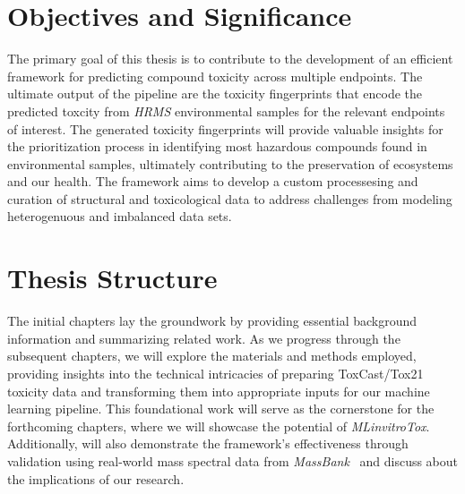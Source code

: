  

\section{Objectives and Significance}

The primary goal of this thesis is to contribute to the development of an efficient framework for predicting compound toxicity across multiple endpoints. The ultimate output of the pipeline are the toxicity fingerprints that encode the predicted toxcity from \emph{HRMS} environmental samples for the relevant endpoints of interest. The generated toxicity fingerprints will provide valuable insights for the prioritization process in identifying most hazardous compounds found in environmental samples, ultimately contributing to the preservation of ecosystems and our health. The framework aims to develop a custom processesing and curation of structural and toxicological data to address challenges from modeling heterogenuous and imbalanced data sets.

\section{Thesis Structure}

The initial chapters lay the groundwork by providing essential background information and summarizing related work. As we progress through the subsequent chapters, we will explore the materials and methods employed, providing insights into the technical intricacies of preparing ToxCast/Tox21 toxicity data and transforming them into appropriate inputs for our machine learning pipeline. This foundational work will serve as the cornerstone for the forthcoming chapters, where we will showcase the potential of \emph{MLinvitroTox}. Additionally, will also demonstrate the framework's effectiveness through validation using real-world mass spectral data from \emph{MassBank}~\cite{massbank} and discuss about the implications of our research.
